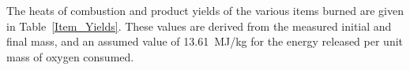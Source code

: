 
The heats of combustion and product yields of the various items burned are given in Table~\ref{Item_Yields}. These values are derived from the measured initial and final mass, and an assumed value of 13.61~MJ/kg for the energy released per unit mass of oxygen consumed.


